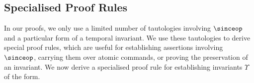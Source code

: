 % 
% 
% 
% 
% 





\subsection{Specialised Proof Rules}
In our proofs, we only use a limited number of tautologies involving $\sinceop$ 
and a particular form of a temporal invariant. We use these tautologies to 
derive special proof rules, which are useful for establishing assertions involving $\sinceop$, 
carrying them over atomic commands, or proving the preservation of an invariant.
We now derive a specialised proof rule for establishing invariants $\Upsilon$ of the form.

